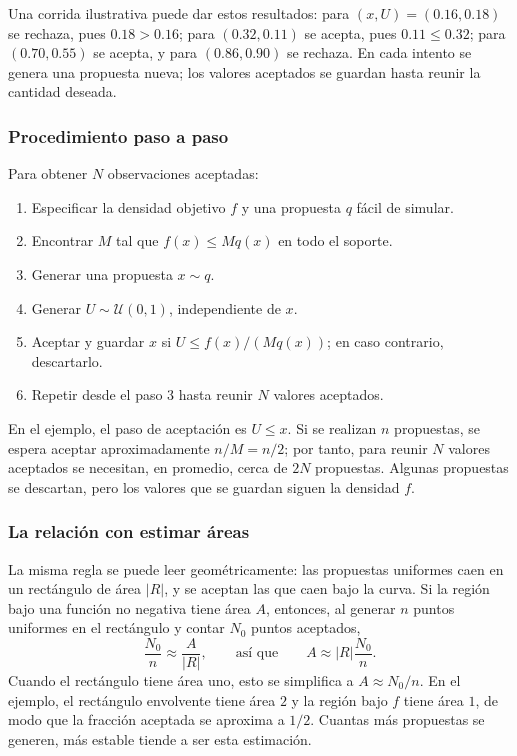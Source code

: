 Una corrida ilustrativa puede dar estos resultados: para $(x,U)=(0.16,0.18)$
se rechaza, pues $0.18>0.16$; para $(0.32,0.11)$ se acepta, pues
$0.11\leq0.32$; para $(0.70,0.55)$ se acepta, y para $(0.86,0.90)$ se
rechaza. En cada intento se genera una propuesta nueva; los valores aceptados
se guardan hasta reunir la cantidad deseada.


\subsubsection{Procedimiento paso a paso}

Para obtener $N$ observaciones aceptadas:
\begin{enumerate}
    \item Especificar la densidad objetivo $f$ y una propuesta $q$ fácil de
    simular.
    \item Encontrar $M$ tal que $f(x)\leq Mq(x)$ en todo el soporte.
    \item Generar una propuesta $x\sim q$.
    \item Generar $U\sim\mathcal{U}(0,1)$, independiente de $x$.
    \item Aceptar y guardar $x$ si $U\leq f(x)/(Mq(x))$; en caso contrario,
    descartarlo.
    \item Repetir desde el paso 3 hasta reunir $N$ valores aceptados.
\end{enumerate}

En el ejemplo, el paso de aceptación es $U\leq x$. Si se realizan $n$
propuestas, se espera aceptar aproximadamente $n/M=n/2$; por tanto, para
reunir $N$ valores aceptados se necesitan, en promedio, cerca de $2N$
propuestas. Algunas propuestas se descartan, pero los valores que se guardan
siguen la densidad $f$.



\subsubsection{La relación con estimar áreas}

La misma regla se puede leer geométricamente: las propuestas uniformes caen
en un rectángulo de área $|R|$, y se aceptan las que caen bajo la curva. Si la
región bajo una función no negativa tiene área $A$, entonces, al generar $n$
puntos uniformes en el rectángulo y contar $N_0$ puntos aceptados,
\[
    \frac{N_0}{n}\approx\frac{A}{|R|},
    \qquad\text{así que}\qquad
    A\approx |R|\frac{N_0}{n}.
\]
Cuando el rectángulo tiene área uno, esto se simplifica a
$A\approx N_0/n$. En el ejemplo, el rectángulo envolvente tiene área $2$ y la
región bajo $f$ tiene área $1$, de modo que la fracción aceptada se aproxima a
$1/2$. Cuantas más propuestas se generen, más estable tiende a ser esta
estimación.

